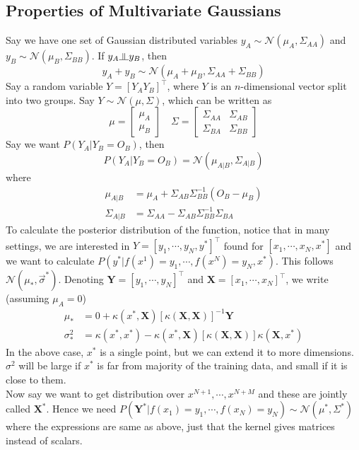 \subsection{Properties of Multivariate Gaussians}
Say we have one set of Gaussian distributed variables $y_A \sim \mathcal N(\mu_A, \Sigma_{AA})$ and $y_B \sim \mathcal{N}(\mu_B, \Sigma_{BB})$. If $y_A \ind y_B$, then
\begin{equation}
	y_A + y_B \sim \mathcal{N}(\mu_A + \mu_B, \Sigma_{AA} + \Sigma_{BB})
\end{equation}
Say a random variable $ Y = [Y_A Y_B]^\top$, where $Y$ is an $n$-dimensional vector split into two groups. Say $Y \sim \mathcal{N}(\mu, \Sigma)$, which can be written as
\[\mu = \begin{bmatrix}
	\mu_A \\ \mu_B
\end{bmatrix} \quad \Sigma = \begin{bmatrix}
\Sigma_{AA} & \Sigma_{AB} \\
\Sigma_{BA} & \Sigma_{BB}
\end{bmatrix}\]
Say we want $P(Y_A | Y_B = O_B)$, then
\begin{equation}
	P(Y_A | Y_B = O_B) = \mathcal{N}(\mu_{A|B}, \Sigma_{A|B}) 
\end{equation}
where
\begin{align}
	\mu_{A|B} &= \mu_A + \Sigma_{AB}\Sigma_{BB}^{-1}(O_B - \mu_B) \\
	\Sigma_{A|B} &= \Sigma_{AA} - \Sigma_{AB}\Sigma_{BB}^{-1}\Sigma_{BA}
\end{align}
To calculate the posterior distribution of the function, notice that 
in many settings, we are interested in $Y = [y_1, \cdots, y_N, y^*]^\top$ found for $[x_1, \cdots, x_N, x^*]$ and we want to calculate $P(y^* | f(x^1) = y_1, \cdots, f(x^N)=y_N, x^*)$. This follows $\mathcal{N}(\mu_*, \overrightarrow{\sigma}^*)$. Denoting $\mathbf Y = [y_1, \cdots, y_N]^\top$ and $\mathbf X = [x_1, \cdots, x_N]^\top$, we write (assuming $\mu_A = 0$)
\begin{align}
\mu_*&= 0 + \kappa(x^*, \mathbf X) [\kappa(\mathbf X, \mathbf X)]^{-1}\mathbf Y \\
\sigma^2_* &= \kappa(x^*, x^*) - \kappa(x^*, \mathbf X)[\kappa(\mathbf X, \mathbf X)]\kappa(\mathbf X, x^*)
\end{align}
In the above case, $x^*$ is a single point, but we can extend it to more dimensions. $\sigma^2$ will be large if $x^*$ is far from majority of the training data, and small if it is close to them. \\
Now say we want to get distribution over $x^{N+1}, \cdots, x^{N+M}$ and these are jointly called $\mathbf X^*$. Hence we need $P(\mathbf Y^* | f(x_1) = y_1, \cdots, f(x_N)=y_N) \sim \mathcal{N}(\mu^*, \Sigma^*)$ where the expressions are same as above, just that the kernel gives matrices instead of scalars.
